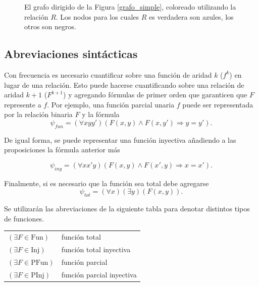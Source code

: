 \begin{figure}[h]
\begin{center}
\end{center}
\caption[Grafo dirigido coloreado por una relación]{El grafo dirigido de la Figura \ref{grafo_simple}, coloreado
utilizando la relación $R$. Los nodos para los cuales $R$ es verdadera son
azules, los otros son negros.}
\label{grafo_coloreado}
\end{figure}

\subsection{Abreviaciones sintácticas}
Con frecuencia es necesario cuantificar sobre una función de aridad $k$ ($f^k$)
en lugar de una relación. Esto puede hacerse cuantificando sobre una relación de
aridad $k+1$ ($F^{k+1}$) y agregando fórmulas de primer orden que garanticen
que $F$ represente a $f$. Por ejemplo, una función parcial unaria $f$ puede ser
representada por la relación binaria $F$ y la fórmula
\[ \psi_{fun} = (\forall xyy')(F(x, y) \land F(x, y') \Rightarrow y = y'). \]

De igual forma, se puede representar una función inyectiva añadiendo a las
proposiciones la fórmula anterior más

\[ \psi_{iny} = (\forall xx'y)(F(x, y) \land F(x', y) \Rightarrow x = x'). \]

Finalmente, si es necesario que la función sea total debe agregarse
\[ \psi_{tot} = (\forall x)(\exists y)(F(x, y)). \]

Se utilizarán las abreviaciones de la siguiente tabla para denotar distintos
tipos de funciones.

\begin{tabular}{ll}
$(\exists F \in \text{Fun})$ & función total\\
$(\exists F \in \text{Inj})$ & función total inyectiva\\
$(\exists F \in \text{PFun})$ & función parcial\\
$(\exists F \in \text{PInj})$ & función parcial inyectiva\\
\end{tabular}

